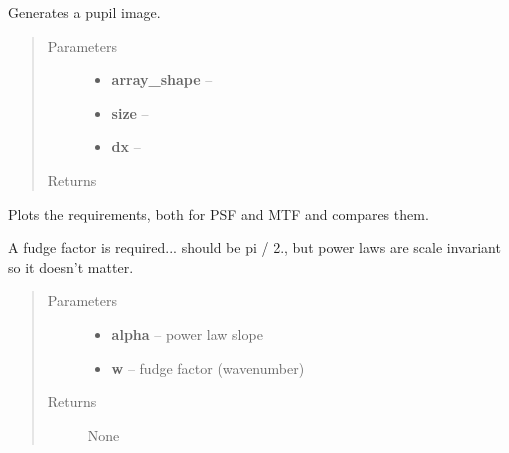 \documentclass[a4paper,11pt,english]{sphinxmanual}
\begin{document}

\begin{fulllineitems}
\label{instrument:sandbox.MTF.pupilImage}
Generates a pupil image.
\begin{quote}\begin{description}
\item[{Parameters}] \leavevmode\begin{itemize}
\item {} 
\textbf{array\_shape} -- 

\item {} 
\textbf{size} -- 

\item {} 
\textbf{dx} -- 

\end{itemize}

\item[{Returns}] \leavevmode


\end{description}\end{quote}

\end{fulllineitems}


\begin{fulllineitems}
\label{instrument:sandbox.MTF.requirement}
Plots the requirements, both for PSF and MTF and compares them.

A fudge factor is required... should be pi / 2., but power laws are scale invariant so it doesn't matter.
\begin{quote}\begin{description}
\item[{Parameters}] \leavevmode\begin{itemize}
\item {} 
\textbf{alpha} -- power law slope

\item {} 
\textbf{w} -- fudge factor (wavenumber)

\end{itemize}

\item[{Returns}] \leavevmode
None

\end{description}\end{quote}

\end{fulllineitems}
\end{document}
